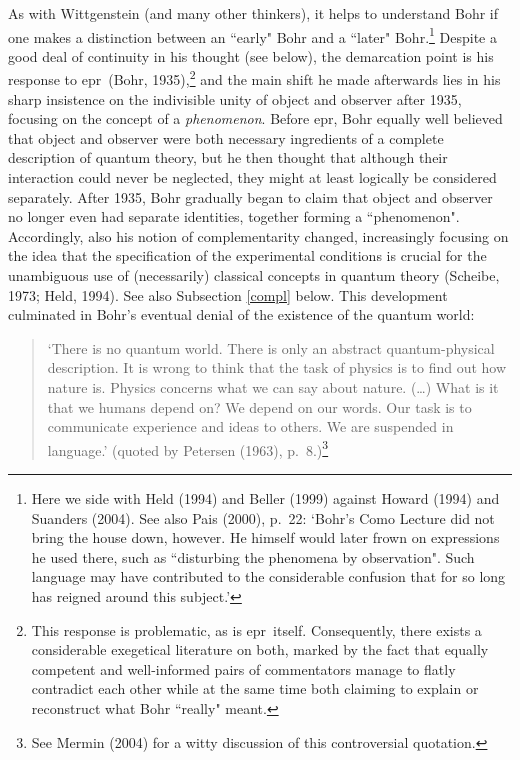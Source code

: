 \documentclass[12pt,titlepage]{article}
\newcommand{\epr}{{\sc epr}}
\begin{document}
As with Wittgenstein (and many other thinkers), it helps to understand Bohr if one makes a distinction between an ``early" Bohr and a ``later" Bohr.\footnote{Here we side with Held (1994) and Beller (1999) against Howard (1994) and Suanders (2004). See also Pais (2000), p.\ 22: `Bohr's Como Lecture did not bring the house down, however. He himself would later frown on expressions he used there, such as ``disturbing the phenomena by observation". Such language may have contributed to the considerable confusion that for so long has reigned around this subject.'\label{paisnote}}  Despite a good deal of continuity in his thought (see below), the demarcation point is his response  to \epr\  (Bohr, 1935),\footnote{This response is problematic, as is \epr\  itself. Consequently, there exists a considerable exegetical literature on both, marked by the fact that equally competent and well-informed pairs of commentators manage to flatly contradict each other while at the same time both claiming to explain or reconstruct what Bohr ``really" meant. }  and the main shift he  made afterwards lies in his sharp insistence on the indivisible unity of object and observer after 1935, focusing on the concept of a {\it phenomenon}.
  Before \epr, Bohr equally well believed that object and observer were both necessary ingredients of a complete description of quantum theory, but he then thought that although their interaction could never be neglected,  they might at least logically be considered separately. After 1935, Bohr gradually began to claim that object and observer no longer even had  separate identities, together forming a ``phenomenon". Accordingly, also his notion of complementarity changed, increasingly focusing on the idea that the specification of the experimental conditions is crucial for the unambiguous use of (necessarily) classical concepts in quantum theory (Scheibe, 1973; Held, 1994). See also Subsection \ref{compl} below. 
This development culminated in Bohr's eventual denial of the existence of the quantum world: 
\begin{quote}
`There is no quantum world. There is only an abstract quantum-physical description. It is wrong to think that the task of physics is to find out how nature is. Physics concerns what we can say about nature. (\ldots) What is it that we humans depend on? We depend on our words. Our task is to communicate experience and ideas to others. We are suspended in language.' (quoted by Petersen (1963), p.\ 8.)\footnote{See Mermin (2004) 
for a witty discussion of this controversial  quotation.}  \end{quote}
\end{document}
